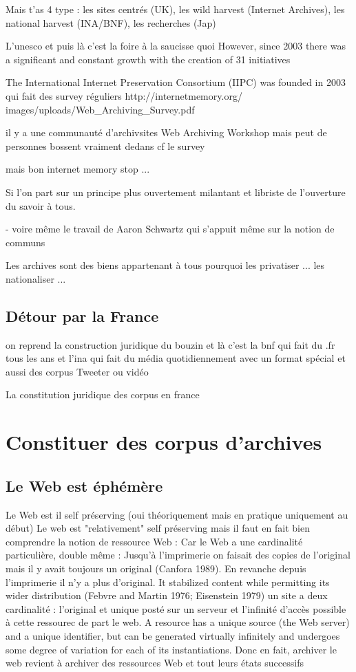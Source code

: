 \documentclass[symmetric,justified,marginals=raggedouter]{tufte-book}
\begin{document}
Mais t'as 4 type : les sites centrés (UK), les wild harvest (Internet Archives), les national harvest (INA/BNF), les recherches (Jap)

L'unesco et puis là c'est la foire à la saucisse quoi 
However, since 2003 there was a significant and constant growth with the creation of 31 initiatives

The International Internet Preservation Consortium (IIPC) was founded in 2003 qui fait des survey réguliers http://internetmemory.org/
images/uploads/Web\_Archiving\_Survey.pdf

il y a une communauté d'archivsites Web Archiving Workshop mais peut de personnes bossent vraiment dedans cf le survey

mais bon internet memory stop ...


Si l'on part sur un principe plus ouvertement milantant et libriste de l'ouverture du savoir à tous. 

- voire même le travail de Aaron Schwartz qui s'appuit même sur la notion de communs

Les archives sont des biens appartenant à tous pourquoi les privatiser ... les nationaliser ... 

\subsection{Détour par la France}

on reprend la construction juridique du bouzin et là c'est la bnf qui fait du .fr tous les ans et l'ina qui fait du média quotidiennement avec un format spécial et aussi des corpus Tweeter ou vidéo 

La constitution juridique des corpus en france 

\section{Constituer des corpus d'archives}
\label{sec:3_constituer}

\subsection{Le Web est éphémère}

Le Web est il self préserving (oui théoriquement mais en pratique uniquement au début)
Le web est "relativement" self préserving mais il faut en fait bien comprendre la notion de ressource Web :
Car le Web a une cardinalité particulière, double même : 
Jusqu'à l'imprimerie on faisait des copies de l'original mais il y avait toujours un original (Canfora 1989).
En revanche depuis l'imprimerie il n'y a plus d'original. It stabilized content while permitting its wider distribution (Febvre and Martin 1976; Eisenstein 1979)
un site a deux cardinalité : l'original et unique posté sur un serveur et l'infinité d'accès possible à cette ressourec de part le web. 
A resource has a unique source (the Web server) and a unique identifier, but can be generated virtually infinitely and undergoes some degree of variation for each of its instantiations.
Donc en fait, archiver le web revient à archiver des ressources Web et tout leurs états successifs
\end{document}
